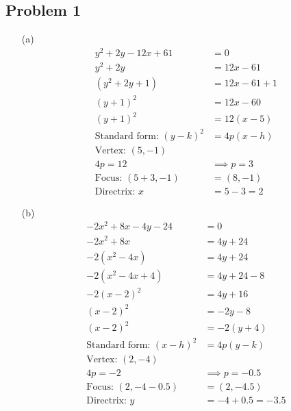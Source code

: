 \documentclass[12pt]{article}
\begin{document}
\subsection*{Problem 1}
\begin{enumerate}
    \item[(a)] 
    \begin{align*}
    y^2 + 2y - 12x + 61 &= 0 \\
    y^2 + 2y &= 12x - 61 \\
    (y^2 + 2y + 1) &= 12x - 61 + 1 \\
    (y + 1)^2 &= 12x - 60 \\
    (y + 1)^2 &= 12(x - 5) \\
    \text{Standard form: } (y - k)^2 &= 4p(x - h) \\
    \text{Vertex: } (5, -1) \\
    4p = 12 &\implies p = 3 \\
    \text{Focus: } (5 + 3, -1) &= (8, -1) \\
    \text{Directrix: } x &= 5 - 3 = 2
    \end{align*}

    \item[(b)] 
    \begin{align*}
    -2x^2 + 8x - 4y - 24 &= 0 \\
    -2x^2 + 8x &= 4y + 24 \\
    -2(x^2 - 4x) &= 4y + 24 \\
    -2(x^2 - 4x + 4) &= 4y + 24 - 8 \\
    -2(x - 2)^2 &= 4y + 16 \\
    (x - 2)^2 &= -2y - 8 \\
    (x - 2)^2 &= -2(y + 4) \\
    \text{Standard form: } (x - h)^2 &= 4p(y - k) \\
    \text{Vertex: } (2, -4) \\
    4p = -2 &\implies p = -0.5 \\
    \text{Focus: } (2, -4 - 0.5) &= (2, -4.5) \\
    \text{Directrix: } y &= -4 + 0.5 = -3.5
    \end{align*}
\end{enumerate}
\end{document}

